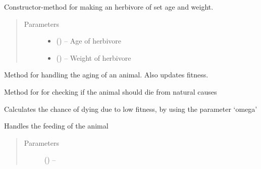 \documentclass[a4paper,10pt,english]{sphinxmanual}
\begin{document}

\begin{fulllineitems}
\label{\detokenize{animals:biosim.animals.Herbivore}}
Constructor-method for making an herbivore of set age and weight.
\begin{quote}\begin{description}
\item[{Parameters}] \leavevmode\begin{itemize}
\item {} 
 () -- Age of herbivore

\item {} 
 () -- Weight of herbivore

\end{itemize}

\end{description}\end{quote}

\begin{fulllineitems}
\label{\detokenize{animals:biosim.animals.Herbivore.aging}}
Method for handling the aging of an animal. Also updates fitness.

\end{fulllineitems}


\begin{fulllineitems}
\label{\detokenize{animals:biosim.animals.Herbivore.death}}
Method for for checking if the animal should die from natural causes

Calculates the chance of dying due to low fitness, by using the
parameter `omega'

\end{fulllineitems}


\begin{fulllineitems}
\label{\detokenize{animals:biosim.animals.Herbivore.feeding}}
Handles the feeding of  the animal
\begin{quote}\begin{description}
\item[{Parameters}] \leavevmode
{} (\sphinxstyleliteralemphasis{, }) -- 


\end{description}
\end{quote}
\end{fulllineitems}
\end{fulllineitems}
\end{document}

